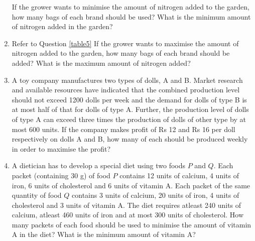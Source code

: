 \documentclass[journal,12pt,twocolumn]{IEEEtran}
\begin{document}
\begin{enumerate}
If the grower wants to minimise the amount of nitrogen added to the garden, how many bags of each brand should be used? What is the minimum amount of nitrogen added in the garden?

\begin{table}[h]
\centering

\caption{}
\label{table5}
\end{table}

\item Refer to Question \ref{table5} If the grower wants to maximise the amount of nitrogen added to the garden, how many bags of each brand should be added? What is the maximum amount of nitrogen added?

\item A toy company manufactures two types of dolls, A and B. Market research and available resources have indicated that the combined production level should not exceed 1200 dolls per week and the demand for dolls of type B is at most half of that for dolls of type A. Further, the production level of dolls of type A can exceed three times the production of dolls of other type by at most 600 units. If the company makes profit of Rs 12 and Rs 16 per doll respectively on dolls A and B, how many of each should be produced weekly in order to maximise the profit?

\item A dietician has to develop a special diet using two foods $P$ and $Q$. Each packet (containing 30 g) of food $P$ contains 12 units of calcium, 4 units of iron, 6 units of cholesterol and 6 units of vitamin A. Each packet of the same quantity of food $Q$ contains 3 units of calcium, 20 units of iron, 4 units of cholesterol and 3 units of vitamin A. The diet requires atleast 240 units of calcium, atleast 460 units of iron and at most 300 units of cholesterol. How many packets of each food should be used to minimise the amount of vitamin A in the diet? What is the minimum amount of vitamin A?
\end{enumerate}
\end{document}
